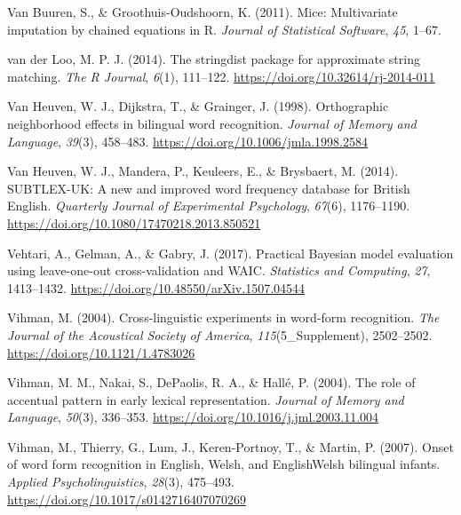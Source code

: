 \documentclass[
  12pt,
  b5paperpaper,
  twoside]{scrreprt}
\newlength{\cslhangindent}
\newlength{\cslentryspacingunit} %
\newenvironment{CSLReferences}[2] %
 {%
  \setlength{\parindent}{0pt}
  \ifodd #1
  \let\oldpar\par
  \def\par{\hangindent=\cslhangindent\oldpar}
  \fi
  \setlength{\parskip}{#2\cslentryspacingunit}
 }%
 {}
\begin{document}
\begin{CSLReferences}{1}{0}
\leavevmode{}%
Van Buuren, S., \& Groothuis-Oudshoorn, K. (2011). Mice: Multivariate
imputation by chained equations in {R}. \emph{Journal of Statistical
Software}, \emph{45}, 1--67.

\leavevmode{}%
van der Loo, M. P. J. (2014). The stringdist package for approximate
string matching. \emph{The R Journal}, \emph{6}(1), 111--122.
\url{https://doi.org/10.32614/rj-2014-011}

\leavevmode{}%
Van Heuven, W. J., Dijkstra, T., \& Grainger, J. (1998). Orthographic
neighborhood effects in bilingual word recognition. \emph{Journal of
Memory and Language}, \emph{39}(3), 458--483.
\url{https://doi.org/10.1006/jmla.1998.2584}

\leavevmode{}%
Van Heuven, W. J., Mandera, P., Keuleers, E., \& Brysbaert, M. (2014).
{SUBTLEX-UK}: A new and improved word frequency database for {British
English}. \emph{Quarterly Journal of Experimental Psychology},
\emph{67}(6), 1176--1190.
\url{https://doi.org/10.1080/17470218.2013.850521}

\leavevmode{}%
Vehtari, A., Gelman, A., \& Gabry, J. (2017). Practical {Bayesian} model
evaluation using leave-one-out cross-validation and {WAIC}.
\emph{Statistics and Computing}, \emph{27}, 1413--1432.
\url{https://doi.org/10.48550/arXiv.1507.04544}

\leavevmode{}%
Vihman, M. (2004). Cross-linguistic experiments in word-form
recognition. \emph{The Journal of the Acoustical Society of America},
\emph{115}(5\_Supplement), 2502--2502.
\url{https://doi.org/10.1121/1.4783026}

\leavevmode{}%
Vihman, M. M., Nakai, S., DePaolis, R. A., \& Hallé, P. (2004). The role
of accentual pattern in early lexical representation. \emph{Journal of
Memory and Language}, \emph{50}(3), 336--353.
\url{https://doi.org/10.1016/j.jml.2003.11.004}

\leavevmode{}%
Vihman, M., Thierry, G., Lum, J., Keren-Portnoy, T., \& Martin, P.
(2007). Onset of word form recognition in {English}, {Welsh}, and
{English}{\textendash}{Welsh} bilingual infants. \emph{Applied
Psycholinguistics}, \emph{28}(3), 475--493.
\url{https://doi.org/10.1017/s0142716407070269}


\end{CSLReferences}
\end{document}

